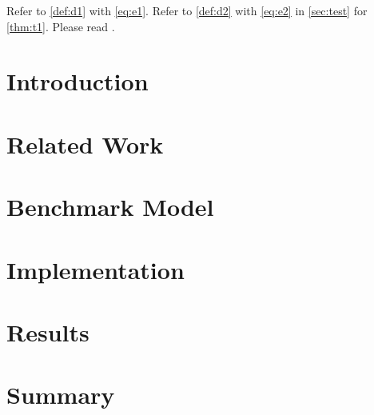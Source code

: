\documentclass{llncs}
\begin{document}
Refer to \cref{def:d1} with \cref{eq:e1}.
Refer to \cref{def:d2} with \cref{eq:e2} in \cref{sec:test} for \cref{thm:t1}.
Please read \cite{montecarlo}.

\section{Introduction}
\label{sec:intro}


\section{Related Work}
\label{sec:related}


\section{Benchmark Model}
\label{sec:benchmark_model}


\section{Implementation}
\label{sec:implementation}


\section{Results}
\label{sec:results}


\section{Summary}
\label{sec:summary}


\printbibliography
\end{document}
